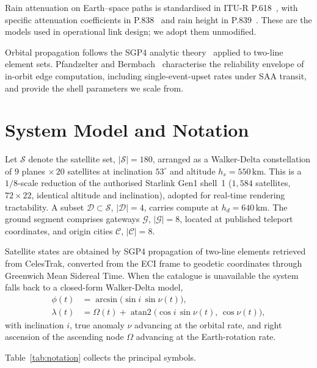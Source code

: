 \documentclass[10pt,twocolumn]{article}
\newcommand{\km}{\,\mathrm{km}}
\newcommand{\Gset}{\mathcal{G}}
\newcommand{\Dset}{\mathcal{D}}
\newcommand{\Cset}{\mathcal{C}}
\newcommand{\Sset}{\mathcal{S}}
\begin{document}
Rain attenuation on Earth--space paths is standardised in ITU-R
P.618~\cite{itu618}, with specific attenuation coefficients in
P.838~\cite{itu838} and rain height in P.839~\cite{itu839}. These are the models
used in operational link design; we adopt them unmodified.

Orbital propagation follows the SGP4 analytic theory~\cite{vallado2006} applied
to two-line element sets. Pfandzelter and Bermbach~\cite{pfandzelter2023}
characterise the reliability envelope of in-orbit edge computation, including
single-event-upset rates under SAA transit, and provide the shell parameters we
scale from.

\section{System Model and Notation}
\label{sec:model}

Let $\Sset$ denote the satellite set, $|\Sset|=180$, arranged as a Walker-Delta
constellation of $9$ planes $\times\,20$ satellites at inclination $53^{\circ}$
and altitude $h_{s}=550\km$. This is a $1/8$-scale reduction of the authorised
Starlink Gen1 shell~1 ($1{,}584$ satellites, $72\times22$, identical altitude and
inclination), adopted for real-time rendering tractability. A subset
$\Dset\subset\Sset$, $|\Dset|=4$, carries compute at $h_{d}=640\km$. The ground
segment comprises gateways $\Gset$, $|\Gset|=8$, located at published teleport
coordinates, and origin cities $\Cset$, $|\Cset|=8$.

Satellite states are obtained by SGP4 propagation of two-line elements retrieved
from CelesTrak, converted from the ECI frame to geodetic coordinates through
Greenwich Mean Sidereal Time. When the catalogue is unavailable the system falls
back to a closed-form Walker-Delta model,
\begin{align}
\phi(t) &= \arcsin\!\big(\sin i\,\sin\nu(t)\big), \\
\lambda(t) &= \Omega(t) + \operatorname{atan2}\!\big(\cos i\,\sin\nu(t),\,\cos\nu(t)\big),
\end{align}
with inclination $i$, true anomaly $\nu$ advancing at the orbital rate, and right
ascension of the ascending node $\Omega$ advancing at the Earth-rotation rate.

Table~\ref{tab:notation} collects the principal symbols.
\end{document}
